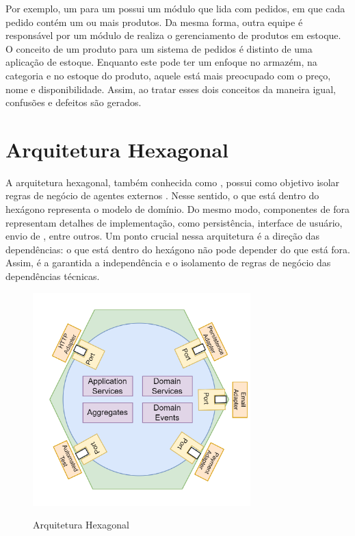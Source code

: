 Por exemplo, um  para um  possui um módulo que lida com pedidos, em que cada pedido contém um ou mais produtos. Da mesma forma, outra equipe é responsável por um módulo de realiza o gerenciamento de produtos em estoque. O conceito de um produto para um sistema de pedidos é distinto de uma aplicação de estoque. Enquanto este pode ter um enfoque no armazém, na categoria e no estoque do produto, aquele está mais preocupado com o preço, nome e disponibilidade. Assim, ao tratar esses dois conceitos da maneira igual, confusões e defeitos são gerados.

\section{Arquitetura Hexagonal} 
A arquitetura hexagonal, também conhecida como , possui como objetivo isolar regras de negócio de agentes externos \cite{cockburn2005}. Nesse sentido, o que está dentro do hexágono representa o modelo de domínio. Do mesmo modo, componentes de fora representam detalhes de implementação, como persistência, interface de usuário, envio de , entre outros. Um ponto crucial nessa arquitetura é a direção das dependências: o que está dentro do hexágono não pode depender do que está fora. Assim, é a garantida a independência e o isolamento de regras de negócio das dependências técnicas.

\begin{figure}[!ht]
    \centering
    \caption{Arquitetura Hexagonal}
    \includegraphics[width=0.75\textwidth]{media/hexagonal_architecture.png}
    \label{fig:arquitetura_hexagonal}
\end{figure}

